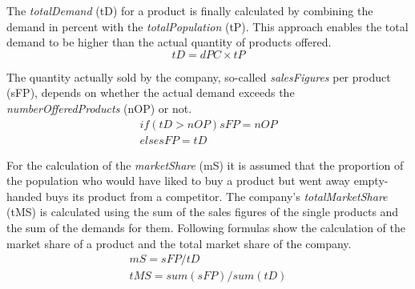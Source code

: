 The \textit{totalDemand} (\gls{tD}) for a product is finally calculated by combining the demand in percent with the \textit{totalPopulation} (\gls{tP}). This approach enables the total demand to be higher than the actual quantity of products offered.
\begin{equation}
\label{func:totalDemand}
tD= dPC \times tP    
\end{equation}

The quantity actually sold by the company, so-called \textit{salesFigures} per product (\gls{sFP}), depends on whether the actual demand exceeds the \textit{numberOfferedProducts} (\gls{nOP}) or not.
\begin{equation}
\label{func:salesFigure}
\begin{aligned}
if ( tD > nOP ) { sFP = nOP } \\
else { sFP = tD }    
\end{aligned}
\end{equation}

For the calculation of the \textit{marketShare} (\gls{mS}) it is assumed that the proportion of the population who would have liked to buy a product but went away empty-handed buys its product from a competitor. The company's \textit{totalMarketShare} (\gls{tMS}) is calculated using the sum of the sales figures of the single products and the sum of the demands for them. Following formulas show the calculation of the market share of a product and the total market share of the company.  
\begin{equation}
\label{func:marketShare}
\begin{aligned}
mS = sFP / tD \\
tMS = sum(sFP) / sum(tD)   
\end{aligned}
\end{equation}

